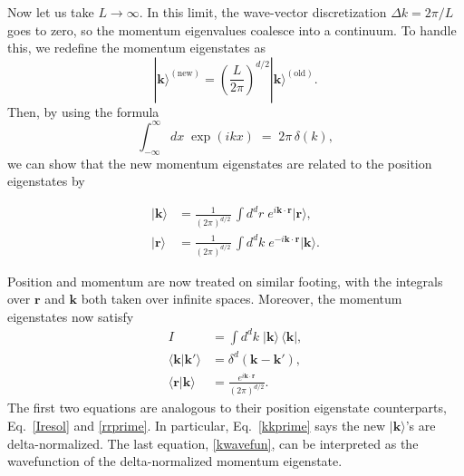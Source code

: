 \documentclass[pra,12pt]{revtex4-2}
\begin{document}
Now let us take $L \rightarrow \infty$.  In this limit, the
wave-vector discretization $\Delta k = 2\pi / L$ goes to zero, so the
momentum eigenvalues coalesce into a continuum.  To handle this, we
redefine the momentum eigenstates as
\begin{equation}
  |\mathbf{k}\rangle^{(\textrm{new})} = \left(\frac{L}{2\pi}\right)^{d/2} |\mathbf{k}\rangle^{(\textrm{old})}.
\end{equation}
Then, by using the formula
\begin{equation}
  \int_{-\infty}^\infty dx\; \exp(ikx) \;=\; 2\pi\, \delta(k),
\end{equation}
we can show that the new momentum eigenstates are related to the
position eigenstates by
\begin{framed}
  \begin{align}
      |\mathbf{k}\rangle &= \frac{1}{(2\pi)^{d/2}} \, \int d^dr \; e^{i\mathbf{k}\cdot\mathbf{r}} |\mathbf{r}\rangle, \label{kcontdef} \\
      |\mathbf{r}\rangle &= \frac{1}{(2\pi)^{d/2}} \, \int d^dk \; e^{-i\mathbf{k}\cdot\mathbf{r}} |\mathbf{k}\rangle. \label{rcontdef}
  \end{align}
\end{framed}
\vskip -0.1in
\noindent
Position and momentum are now treated on similar footing, with the
integrals over $\mathbf{r}$ and $\mathbf{k}$ both taken over infinite
spaces.  Moreover, the momentum eigenstates now satisfy
\begin{align}
  I &= \int d^dk \;|\mathbf{k}\rangle\,\langle\mathbf{k}|, \label{Iresolk} \\
  \langle\mathbf{k}|\mathbf{k}'\rangle &= \delta^d(\mathbf{k}-\mathbf{k}'),
  \label{kkprime} \\
  \langle\mathbf{r}|\mathbf{k}\rangle &= \frac{e^{i\mathbf{k}\cdot\mathbf{r}}}{(2\pi)^{d/2}}. \label{kwavefun}
\end{align}
The first two equations are analogous to their position eigenstate
counterparts, Eq.~\eqref{Iresol} and \eqref{rrprime}.  In particular,
Eq.~\eqref{kkprime} says the new $|\mathbf{k}\rangle$'s are
delta-normalized.  The last equation, \eqref{kwavefun}, can be
interpreted as the wavefunction of the delta-normalized momentum
eigenstate.
\end{document}
